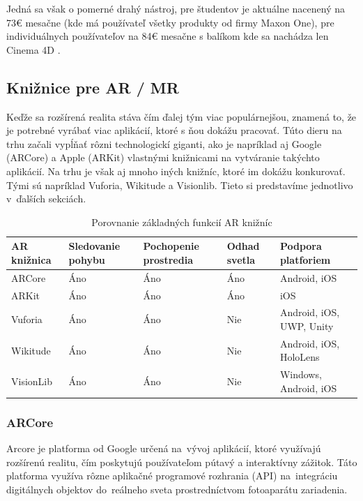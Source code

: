Jedná sa však o pomerné drahý nástroj, pre študentov je aktuálne nacenený na 73€ mesačne (kde má používateľ všetky produkty od firmy Maxon One), pre individuálnych používateľov na 84€ mesačne s balíkom kde sa nachádza len Cinema 4D \cite{maxon2024buy}. 

\subsection{Knižnice pre AR / MR}
Keďže sa rozšírená realita stáva čím ďalej tým viac populárnejšou, znamená to, že je potrebné vyrábať viac aplikácií, ktoré s ňou dokážu pracovať. Túto dieru na trhu začali vypĺňať rôzni technologickí giganti, ako je napríklad aj Google (ARCore) a Apple (ARKit) vlastnými knižnicami na vytváranie takýchto aplikácií. Na trhu je však aj mnoho iných knižníc, ktoré im dokážu konkurovať. Tými sú napríklad Vuforia, Wikitude a Visionlib. Tieto si predstavíme jednotlivo v~ďalších sekciách.

\begin{table}[h]
\centering
\caption{Porovnanie základných funkcií AR knižníc}
\label{tab:ar-features}
\begin{tabularx}{\textwidth}{|l|X|X|X|X|}
\hline
\textbf{AR knižnica} & \textbf{Sledovanie pohybu} & \textbf{Pochopenie prostredia} & \textbf{Odhad svetla} & \textbf{Podpora platforiem} \\ \hline
ARCore & Áno & Áno & Áno & Android, iOS \\ \hline
ARKit & Áno & Áno & Áno & iOS \\ \hline
Vuforia & Áno & Áno & Nie & Android, iOS, UWP, Unity \\ \hline
Wikitude & Áno & Áno & Nie & Android, iOS, HoloLens \\ \hline
VisionLib & Áno & Áno & Nie & Windows, Android, iOS \\ \hline
\end{tabularx}
\end{table}

\subsubsection{ARCore}

Arcore je platforma od Google určená na~vývoj aplikácií, ktoré využívajú rozšírenú realitu, čím poskytujú používateľom pútavý a interaktívny zážitok. Táto platforma využíva rôzne aplikačné programové rozhrania (API) na~integráciu digitálnych objektov do~reálneho sveta prostredníctvom fotoaparátu zariadenia. %

